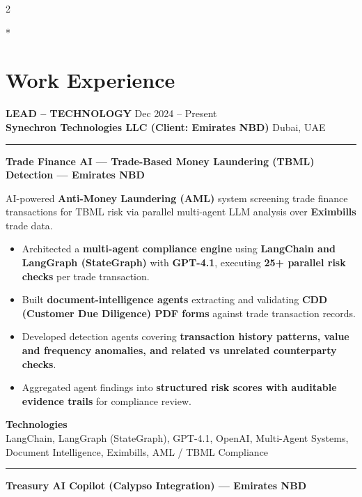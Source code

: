 \documentclass[10pt,a4paper]{article}
\newcommand{\blockdivider}{\vspace{0pt}\color{rulecolor}\rule{\linewidth}{0.5pt}\color{primary}\vspace{4pt}}
\newcommand{\roleheader}[4]{%
  \noindent
  \textbf{\MakeUppercase{#3}}%
  \hfill
  \textcolor{secondary}{#4}\\[0pt]

  \noindent
  \textbf{#1}%
  \hfill
  \textcolor{secondary}{#2}\\[0pt]
}
\newcommand{\roledivider}{%
  \vspace{-1pt}%
  {\color{rulecolor}\rule{\linewidth}{0.5pt}}%
  \vspace{2pt}%
}
\newcommand{\projecttitle}[1]{\textbf{#1}\par\vspace{2pt}}
\begin{document}
\begin{paracol}{2}

\switchcolumn[0]*
\section*{Work Experience}

\roleheader{Synechron Technologies LLC (Client: Emirates NBD)}{Dubai, UAE}{Lead -- Technology}{Dec 2024 -- Present}
\roledivider

\projecttitle{Trade Finance AI — Trade-Based Money Laundering (TBML) Detection — Emirates NBD}

AI-powered \textbf{Anti-Money Laundering (AML)} system screening trade finance transactions for TBML risk via parallel multi-agent LLM analysis over \textbf{Eximbills} trade data.

\begin{itemize}

\item Architected a \textbf{multi-agent compliance engine} using \textbf{LangChain and LangGraph (StateGraph)} with \textbf{GPT-4.1}, executing \textbf{25+ parallel risk checks} per trade transaction.

\item Built \textbf{document-intelligence agents} extracting and validating \textbf{CDD (Customer Due Diligence) PDF forms} against trade transaction records.

\item Developed detection agents covering \textbf{transaction history patterns, value and frequency anomalies, and related vs unrelated counterparty checks}.

\item Aggregated agent findings into \textbf{structured risk scores with auditable evidence trails} for compliance review.

\end{itemize}

\textbf{Technologies}\\
LangChain, LangGraph (StateGraph), GPT-4.1, OpenAI, Multi-Agent Systems, Document Intelligence, Eximbills, AML / TBML Compliance

\blockdivider

\projecttitle{Treasury AI Copilot (Calypso Integration) — Emirates NBD}


\end{paracol}
\end{document}
